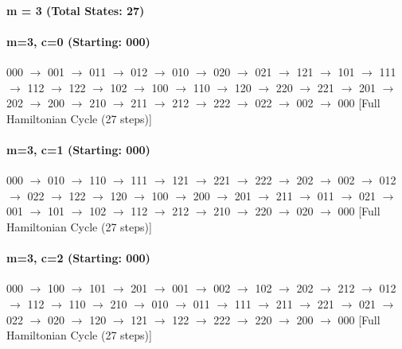 \paragraph{ m = 3 (Total States: 27)}


\paragraph{m=3, c=0 (Starting: 000)}


000 $\rightarrow$ 001 $\rightarrow$ 011 $\rightarrow$ 012 $\rightarrow$ 010 $\rightarrow$ 020 $\rightarrow$ 021 $\rightarrow$ 121 $\rightarrow$ 101 $\rightarrow$ 111 $\rightarrow$ 112 $\rightarrow$ 122 $\rightarrow$ 102 $\rightarrow$ 100 $\rightarrow$ 110 $\rightarrow$ 120 $\rightarrow$ 220 $\rightarrow$ 221 $\rightarrow$ 201 $\rightarrow$ 202 $\rightarrow$ 200 $\rightarrow$ 210 $\rightarrow$ 211 $\rightarrow$ 212 $\rightarrow$ 222 $\rightarrow$ 022 $\rightarrow$ 002 $\rightarrow$ 000 [Full Hamiltonian Cycle (27 steps)]

\paragraph{m=3, c=1 (Starting: 000)}


000 $\rightarrow$ 010 $\rightarrow$ 110 $\rightarrow$ 111 $\rightarrow$ 121 $\rightarrow$ 221 $\rightarrow$ 222 $\rightarrow$ 202 $\rightarrow$ 002 $\rightarrow$ 012 $\rightarrow$ 022 $\rightarrow$ 122 $\rightarrow$ 120 $\rightarrow$ 100 $\rightarrow$ 200 $\rightarrow$ 201 $\rightarrow$ 211 $\rightarrow$ 011 $\rightarrow$ 021 $\rightarrow$ 001 $\rightarrow$ 101 $\rightarrow$ 102 $\rightarrow$ 112 $\rightarrow$ 212 $\rightarrow$ 210 $\rightarrow$ 220 $\rightarrow$ 020 $\rightarrow$ 000 [Full Hamiltonian Cycle (27 steps)]

\paragraph{m=3, c=2 (Starting: 000)}


000 $\rightarrow$ 100 $\rightarrow$ 101 $\rightarrow$ 201 $\rightarrow$ 001 $\rightarrow$ 002 $\rightarrow$ 102 $\rightarrow$ 202 $\rightarrow$ 212 $\rightarrow$ 012 $\rightarrow$ 112 $\rightarrow$ 110 $\rightarrow$ 210 $\rightarrow$ 010 $\rightarrow$ 011 $\rightarrow$ 111 $\rightarrow$ 211 $\rightarrow$ 221 $\rightarrow$ 021 $\rightarrow$ 022 $\rightarrow$ 020 $\rightarrow$ 120 $\rightarrow$ 121 $\rightarrow$ 122 $\rightarrow$ 222 $\rightarrow$ 220 $\rightarrow$ 200 $\rightarrow$ 000 [Full Hamiltonian Cycle (27 steps)]

